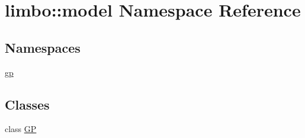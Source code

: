 \hypertarget{namespacelimbo_1_1model}{}\section{limbo\+:\+:model Namespace Reference}
\label{namespacelimbo_1_1model}
\subsection*{Namespaces}
\begin{DoxyCompactItemize}
\item 
 \hyperlink{namespacelimbo_1_1model_1_1gp}{gp}
\end{DoxyCompactItemize}
\subsection*{Classes}
\begin{DoxyCompactItemize}
\item 
class \hyperlink{classlimbo_1_1model_1_1_g_p}{G\+P}
\end{DoxyCompactItemize}
